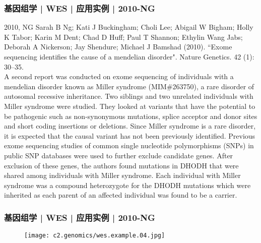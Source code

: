 \begin{frame}
  \frametitle{基因组学 | WES | 应用实例 | 2010-NG}
  \footnotesize{
    \begin{block}{2010, NG}
  Sarah B Ng; Kati J Buckingham; Choli Lee; Abigail W Bigham; Holly K Tabor; Karin M Dent; Chad D Huff; Paul T Shannon; Ethylin Wang Jabs; Deborah A Nickerson; Jay Shendure; Michael J Bamshad (2010). ``Exome sequencing identifies the cause of a mendelian disorder". Nature Genetics. 42 (1): 30–35.\\
  \vspace{1em}
  A second report was conducted on exome sequencing of individuals with a mendelian disorder known as Miller syndrome (MIM\#263750), a rare disorder of autosomal recessive inheritance. Two siblings and two unrelated individuals with Miller syndrome were studied. They looked at variants that have the potential to be pathogenic such as non-synonymous mutations, splice acceptor and donor sites and short coding insertions or deletions. Since Miller syndrome is a rare disorder, it is expected that the causal variant has not been previously identified. Previous exome sequencing studies of common single nucleotide polymorphisms (SNPs) in public SNP databases were used to further exclude candidate genes. After exclusion of these genes, the authors found mutations in DHODH that were shared among individuals with Miller syndrome. Each individual with Miller syndrome was a compound heterozygote for the DHODH mutations which were inherited as each parent of an affected individual was found to be a carrier.
    \end{block}
}
\end{frame}

\begin{frame}
  \frametitle{基因组学 | WES | 应用实例 | 2010-NG}
  \begin{figure}
    \centering
    \texttt{[image: c2.genomics/wes.example.04.jpg]}
  \end{figure}
\end{frame}

